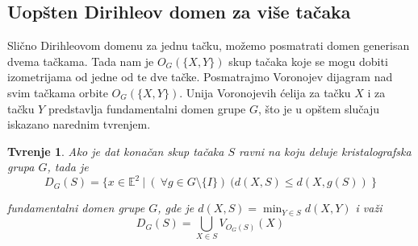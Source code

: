 \documentclass[11pt]{article}
\newtheorem{tvrdjenje}{\bf Tvr\dj enje}
\begin{document}
    \subsection{Uop\v sten Dirihleov domen za vi\v se ta\v caka}\label{konstrukcija-dirihleove-fundamentalne-oblasti}
    
Sli\v cno Dirihleovom domenu za jednu ta\v cku,  mo\v zemo posmatrati domen generisan dvema ta\v ckama. Tada nam je $O_G(\{X,Y\})$ skup ta\v caka koje se mogu dobiti izometrijama od jedne od te dve ta\v cke. Posmatrajmo Voronojev dijagram nad svim ta\v ckama orbite $O_G(\{X,Y\})$. Unija Voronojevih \' celija za ta\v cku $X$ i za ta\v cku $Y$ predstavlja fundamentalni domen grupe $G$, \v sto je u op\v stem slu\v caju iskazano narednim tvr\dj enjem.
\begin{tvrdjenje}
Ako je dat kona\v can skup ta\v caka $S$ ravni na koju deluje kristalografska grupa $G$, tada je 
$$D_G(S) = \{x \in \mathbb{E}^2\:|\:(\:\forall g \in G \setminus \{I\})\:(d(X,S)\leq d(X,g(S))\:\}$$

fundamentalni domen grupe $G$, gde je $d(X,S) = \min_{Y \in S} d(X,Y)$ i va\v zi 
$$D_G(S) = \bigcup_{X \in S} V_{O_G(S)}(X) $$ 
\end{tvrdjenje}


\end{document}
